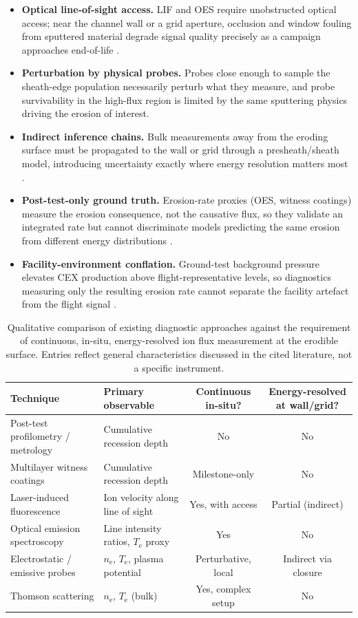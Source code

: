 \begin{itemize}
\item \textbf{Optical line-of-sight access.} LIF and OES require unobstructed optical access; near the channel wall or a grid aperture, occlusion and window fouling from sputtered material degrade signal quality precisely as a campaign approaches end-of-life \cite{ref0454}.
\item \textbf{Perturbation by physical probes.} Probes close enough to sample the sheath-edge population necessarily perturb what they measure, and probe survivability in the high-flux region is limited by the same sputtering physics driving the erosion of interest.
\item \textbf{Indirect inference chains.} Bulk measurements away from the eroding surface must be propagated to the wall or grid through a presheath/sheath model, introducing uncertainty exactly where energy resolution matters most \cite{ref0425}.
\item \textbf{Post-test-only ground truth.} Erosion-rate proxies (OES, witness coatings) measure the erosion consequence, not the causative flux, so they validate an integrated rate but cannot discriminate models predicting the same erosion from different energy distributions \cite{ref0454}.
\item \textbf{Facility-environment conflation.} Ground-test background pressure elevates CEX production above flight-representative levels, so diagnostics measuring only the resulting erosion rate cannot separate the facility artefact from the flight signal \cite{ref0461,ref0481}.
\end{itemize}

\begin{table}[htbp]
\centering
\caption{Qualitative comparison of existing diagnostic approaches against the requirement of continuous, in-situ, energy-resolved ion flux measurement at the erodible surface. Entries reflect general characteristics discussed in the cited literature, not a specific instrument.}
\label{tab:diagcompare}
\begin{tabularx}{\linewidth}{lXcc}
\toprule
Technique & Primary observable & Continuous in-situ? & Energy-resolved at wall/grid? \\
\midrule
Post-test profilometry / metrology & Cumulative recession depth & No & No \\
Multilayer witness coatings & Cumulative recession depth & Milestone-only & No \\
Laser-induced fluorescence & Ion velocity along line of sight & Yes, with access & Partial (indirect) \\
Optical emission spectroscopy & Line intensity ratios, $T_{\mathrm{e}}$ proxy & Yes & No \\
Electrostatic / emissive probes & $n_{\mathrm{e}}$, $T_{\mathrm{e}}$, plasma potential & Perturbative, local & Indirect via closure \\
Thomson scattering & $n_{\mathrm{e}}$, $T_{\mathrm{e}}$ (bulk) & Yes, complex setup & No \\
\bottomrule
\end{tabularx}
\end{table}

